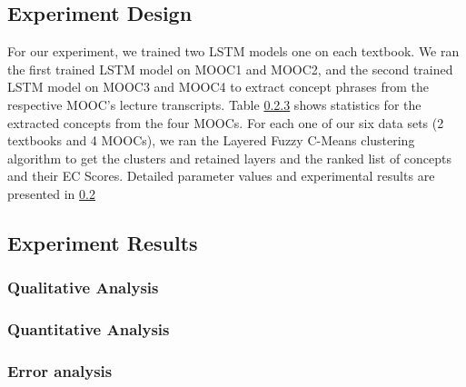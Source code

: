 
\subsection{Experiment Design}
For our experiment, we trained two LSTM models one on each textbook. We ran the first trained LSTM model on MOOC1 and MOOC2, and the second trained LSTM model on MOOC3 and MOOC4 to extract concept phrases from the respective MOOC's lecture transcripts. Table \ref{} shows statistics for the extracted concepts from the four MOOCs.
For each one of our six data sets (2 textbooks and 4 MOOCs), we ran the Layered Fuzzy C-Means clustering algorithm to get the clusters and retained layers and the ranked list of concepts and their EC Scores. Detailed parameter values and experimental results are presented in \ref{exp_results}

\subsection{Experiment Results}\label{exp_results}


\subsubsection{Qualitative Analysis}


\subsubsection{Quantitative Analysis}


\subsubsection{Error analysis}

